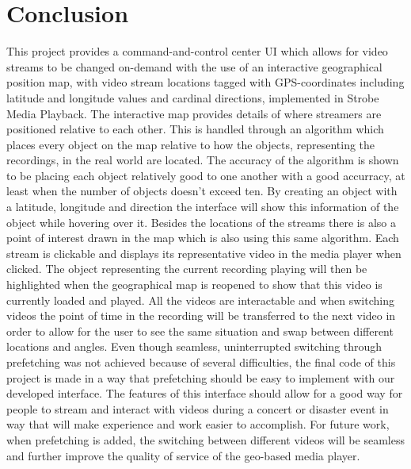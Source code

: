 \chapter{Conclusion}
\label{cha:conclusion}

This project provides a command-and-control center UI which allows for video streams to be changed on-demand with the use of an interactive geographical position map, with video stream locations tagged with GPS-coordinates including latitude and longitude values and cardinal directions, implemented in Strobe Media Playback. The interactive map provides details of where streamers are positioned relative to each other. This is handled through an algorithm which places every object on the map relative to how the objects, representing the recordings, in the real world are located. The accuracy of the algorithm is shown to be placing each object relatively good to one another with a good accurracy, at least when the number of objects doesn’t exceed ten. By creating an object with a latitude, longitude and direction the interface will show this information of the object while hovering over it. Besides the locations of the streams there is also a point of interest drawn in the map which is also using this same algorithm. Each stream is clickable and displays its representative video in the media player when clicked. The object representing the current recording playing will then be highlighted when the geographical map is reopened to show that this video is currently loaded and played. All the videos are interactable and when switching videos the point of time in the recording will be transferred to the next video in order to allow for the user to see the same situation and swap between different locations and angles. Even though seamless, uninterrupted switching through prefetching was not achieved because of several difficulties, the final code of this project is made in a way that prefetching should be easy to implement with our developed interface. The features of this interface should allow for a good way for people to stream and interact with videos during a concert or disaster event in way that will make experience and work easier to accomplish. For future work, when prefetching is added, the switching between different videos will be seamless and further improve the quality of service of the geo-based media player.